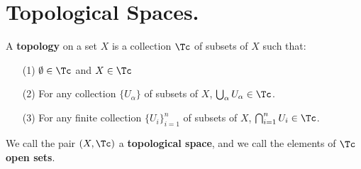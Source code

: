 
\section{Topological Spaces.}

\begin{definition}
    A \textbf{topology} on a set $X$ is a collection  $\Tc$ of subsets of  $X$ such that:
        \begin{enumerate}
            \item[(1)] $\emptyset \in \Tc$ and $X \in \Tc$

            \item[(2)] For any collection $\{U_{\alpha}\}$ of subsets of $X$,  $\bigcup_{\alpha}{U_{\alpha}} \in \Tc$.

            \item[(3)]  For any finite collection $\{U_i\}_{i=1}^{n}$ of subsets of $X$,
                $\bigcap_{i=1}^{n}{U_i} \in \Tc$.
        \end{enumerate}
        We call the pair $(X,\Tc)$ a \textbf{topological space}, and we call the elements
        of  $\Tc$ \textbf{open sets}.
\end{definition}

